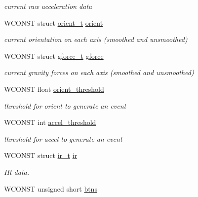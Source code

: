 \begin{DoxyCompactItemize}
\begin{DoxyCompactList}\small\item\em current raw acceleration data \end{DoxyCompactList}\item 
W\-C\-O\-N\-S\-T struct \hyperlink{structorient__t}{orient\-\_\-t} \hyperlink{structwiimote__t_a793dc495a39c2ae4a4a6cd875094070d}{orient}
\begin{DoxyCompactList}\small\item\em current orientation on each axis (smoothed and unsmoothed) \end{DoxyCompactList}\item 
W\-C\-O\-N\-S\-T struct \hyperlink{structgforce__t}{gforce\-\_\-t} \hyperlink{structwiimote__t_ab2ccaf1bd030bfb24aa60c474b34d1f4}{gforce}
\begin{DoxyCompactList}\small\item\em current gravity forces on each axis (smoothed and unsmoothed) \end{DoxyCompactList}\item 
\hypertarget{structwiimote__t_ab8e07b8b47e89082b89396d10100db9a}{W\-C\-O\-N\-S\-T float \hyperlink{structwiimote__t_ab8e07b8b47e89082b89396d10100db9a}{orient\-\_\-threshold}}\label{structwiimote__t_ab8e07b8b47e89082b89396d10100db9a}

\begin{DoxyCompactList}\small\item\em threshold for orient to generate an event \end{DoxyCompactList}\item 
\hypertarget{structwiimote__t_a078b9e0aeeacfdabad482db1214d0a88}{W\-C\-O\-N\-S\-T int \hyperlink{structwiimote__t_a078b9e0aeeacfdabad482db1214d0a88}{accel\-\_\-threshold}}\label{structwiimote__t_a078b9e0aeeacfdabad482db1214d0a88}

\begin{DoxyCompactList}\small\item\em threshold for accel to generate an event \end{DoxyCompactList}\item 
\hypertarget{structwiimote__t_a1435415306dac952f29a70d4c3ff206c}{W\-C\-O\-N\-S\-T struct \hyperlink{structir__t}{ir\-\_\-t} \hyperlink{structwiimote__t_a1435415306dac952f29a70d4c3ff206c}{ir}}\label{structwiimote__t_a1435415306dac952f29a70d4c3ff206c}

\begin{DoxyCompactList}\small\item\em I\-R data. \end{DoxyCompactList}\item 
\hypertarget{structwiimote__t_a2e9cbb4da318589efc65ceadc62aca6c}{W\-C\-O\-N\-S\-T unsigned short \hyperlink{structwiimote__t_a2e9cbb4da318589efc65ceadc62aca6c}{btns}}\label{structwiimote__t_a2e9cbb4da318589efc65ceadc62aca6c}


\end{DoxyCompactItemize}
